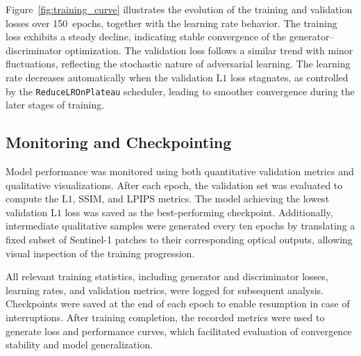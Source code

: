 Figure~\ref{fig:training_curve} illustrates the evolution of the training and validation losses over 150~epochs, together with the learning rate behavior. The training loss exhibits a steady decline, indicating stable convergence of the generator–discriminator optimization. The validation loss follows a similar trend with minor fluctuations, reflecting the stochastic nature of adversarial learning. The learning rate decreases automatically when the validation $\mathrm{L1}$ loss stagnates, as controlled by the \texttt{ReduceLROnPlateau} scheduler, leading to smoother convergence during the later stages of training.

\subsection{Monitoring and Checkpointing}
Model performance was monitored using both quantitative validation metrics and qualitative visualizations. After each epoch, the validation set was evaluated to compute the $\mathrm{L1}$, SSIM, and LPIPS metrics. The model achieving the lowest validation $\mathrm{L1}$ loss was saved as the best-performing checkpoint. Additionally, intermediate qualitative samples were generated every ten epochs by translating a fixed subset of Sentinel-1 patches to their corresponding optical outputs, allowing visual inspection of the training progression.

All relevant training statistics, including generator and discriminator losses, learning rates, and validation metrics, were logged for subsequent analysis. Checkpoints were saved at the end of each epoch to enable resumption in case of interruptions. After training completion, the recorded metrics were used to generate loss and performance curves, which facilitated evaluation of convergence stability and model generalization.



